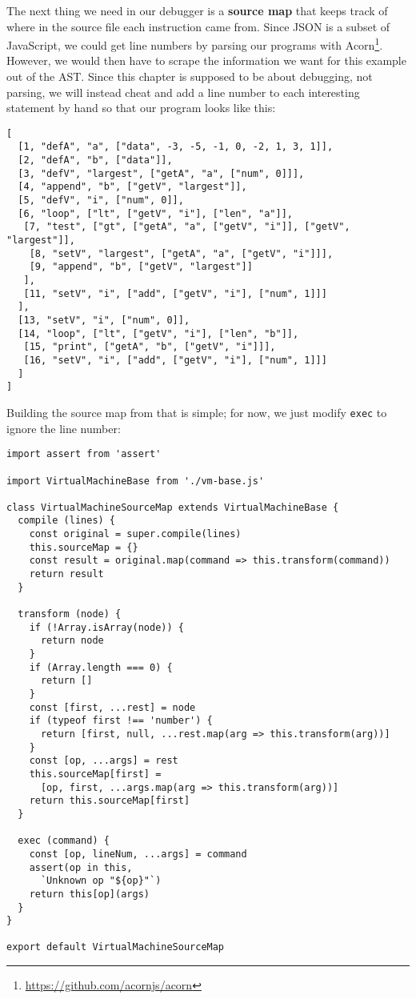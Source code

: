 \documentclass[krantzl]{krantz}
\newcommand{\glossref}[1]{\textbf{#1}}
\newcommand{\hreffoot}[2]{{#1}\footnote{\href{#2}{#2}}}
\begin{document}
The next thing we need in our debugger is
a \glossref{source map} that keeps track of
where in the source file each instruction came from.
Since JSON is a subset of JavaScript,
we could get line numbers by parsing our programs with \hreffoot{Acorn}{https://github.com/acornjs/acorn}.
However,
we would then have to scrape the information we want for this example out of the AST.
Since this chapter is supposed to be about debugging,
not parsing,
we will instead cheat and add a line number to each interesting statement by hand
so that our program looks like this:


\begin{lstlisting}[frame=single,frameround=tttt]
[
  [1, "defA", "a", ["data", -3, -5, -1, 0, -2, 1, 3, 1]],
  [2, "defA", "b", ["data"]],
  [3, "defV", "largest", ["getA", "a", ["num", 0]]],
  [4, "append", "b", ["getV", "largest"]],
  [5, "defV", "i", ["num", 0]],
  [6, "loop", ["lt", ["getV", "i"], ["len", "a"]],
   [7, "test", ["gt", ["getA", "a", ["getV", "i"]], ["getV", "largest"]],
    [8, "setV", "largest", ["getA", "a", ["getV", "i"]]],
    [9, "append", "b", ["getV", "largest"]]
   ],
   [11, "setV", "i", ["add", ["getV", "i"], ["num", 1]]]
  ],
  [13, "setV", "i", ["num", 0]],
  [14, "loop", ["lt", ["getV", "i"], ["len", "b"]],
   [15, "print", ["getA", "b", ["getV", "i"]]],
   [16, "setV", "i", ["add", ["getV", "i"], ["num", 1]]]
  ]
]
\end{lstlisting}



Building the source map from that is simple;
for now,
we just modify \texttt{exec} to ignore the line number:


\begin{lstlisting}[frame=single,frameround=tttt]
import assert from 'assert'

import VirtualMachineBase from './vm-base.js'

class VirtualMachineSourceMap extends VirtualMachineBase {
  compile (lines) {
    const original = super.compile(lines)
    this.sourceMap = {}
    const result = original.map(command => this.transform(command))
    return result
  }

  transform (node) {
    if (!Array.isArray(node)) {
      return node
    }
    if (Array.length === 0) {
      return []
    }
    const [first, ...rest] = node
    if (typeof first !== 'number') {
      return [first, null, ...rest.map(arg => this.transform(arg))]
    }
    const [op, ...args] = rest
    this.sourceMap[first] =
      [op, first, ...args.map(arg => this.transform(arg))]
    return this.sourceMap[first]
  }

  exec (command) {
    const [op, lineNum, ...args] = command
    assert(op in this,
      `Unknown op "${op}"`)
    return this[op](args)
  }
}

export default VirtualMachineSourceMap
\end{lstlisting}
\end{document}
